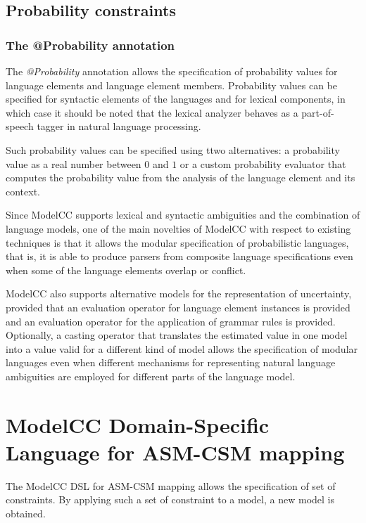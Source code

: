 \documentclass[a4paper,twoside,onecolumn]{article}
\begin{document}
\subsection{Probability constraints}

\subsubsection{The @Probability annotation}

The \emph{@Probability} annotation allows the specification of probability values for language elements and language element members. Probability values can be specified for syntactic elements of the languages and for lexical components, in which case it should be noted that the lexical analyzer behaves as a part-of-speech tagger in natural language processing.

Such probability values can be specified using ttwo alternatives: a probability value as a real number between $0$ and $1$ or a custom probability evaluator that computes the probability value from the analysis of the language element and its context.

Since ModelCC supports lexical and syntactic ambiguities and the combination of language models, one of the main novelties of ModelCC with respect to existing techniques is that it allows the modular specification of probabilistic languages, that is, it is able to produce parsers from composite language specifications even when some of the language elements overlap or conflict.

ModelCC also supports alternative models for the representation of uncertainty, provided that an evaluation operator for language element instances is provided and an evaluation operator for the application of grammar rules is provided.
Optionally, a casting operator that translates the estimated value in one model into a value valid for a different kind of model allows the specification of modular languages even when different mechanisms for representing natural language ambiguities are employed for different parts of the language model.

\section{ModelCC Domain-Specific Language for ASM-CSM mapping} \label{sec:asmcsm}

The ModelCC DSL for ASM-CSM mapping allows the specification of set of constraints.
By applying such a set of constraint to a model, a new model is obtained.
\end{document}
